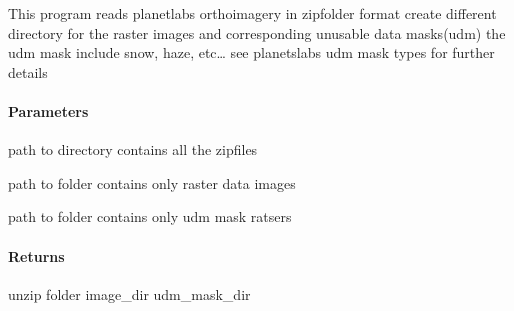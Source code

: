 \documentclass[letterpaper,10pt,english]{sphinxmanual}
\begin{document}
\begin{fulllineitems}
\label{\detokenize{akhdefo_functions:akhdefo_functions.Unzip_CopyFiles.read_data_prep}}
\pysigstartsignatures
{}
\pysigstopsignatures
\sphinxAtStartPar
This program reads planetlabs orthoimagery in zipfolder format
create different directory for the raster images and corresponding unusable data masks(udm)
the udm mask include snow, haze, etc… see planetslabs udm mask types for further details


\paragraph{Parameters}
\label{\detokenize{akhdefo_functions:id43}}\begin{description}
\sphinxAtStartPar
path to directory contains all the zipfiles

\sphinxAtStartPar
path to folder contains only raster data images

\sphinxAtStartPar
path to folder contains only udm mask ratsers

\end{description}


\paragraph{Returns}
\label{\detokenize{akhdefo_functions:id44}}
\sphinxAtStartPar
unzip folder
image\_dir
udm\_mask\_dir

\end{fulllineitems}
\end{document}
